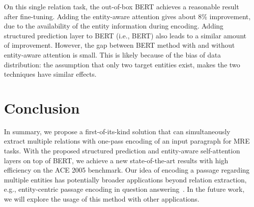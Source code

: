\documentclass[11pt,a4paper]{article}
\begin{document}
On this single relation task, the out-of-box BERT achieves a reasonable result after fine-tuning. Adding the entity-aware attention gives about 8\% improvement, due to the availability of the entity information during encoding.
Adding structured prediction layer to BERT (i.e., BERT) also leads to a similar amount of improvement.
However, the gap between BERT method with and without entity-aware attention is small.
This is likely because of the bias of data distribution: the assumption that only two target entities exist, makes the two techniques have similar effects.

\section{Conclusion}
In summary, we propose a first-of-its-kind solution that can simultaneously extract multiple relations with one-pass encoding of an input paragraph for MRE tasks.
With the proposed structured prediction and entity-aware self-attention layers on top of BERT, we achieve a new state-of-the-art results with high efficiency on the ACE 2005 benchmark.
Our idea of encoding a passage regarding multiple entities has potentially broader applications beyond relation extraction, e.g., entity-centric passage encoding in question answering~\cite{song2018exploring}. In the future work, we will explore the usage of this method with other applications.



\end{document}
